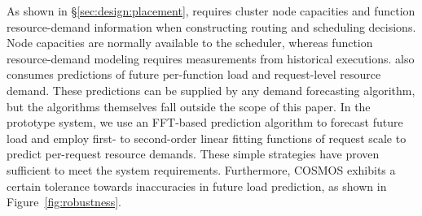 As shown in \S\ref{sec:design:placement}, \sysname requires cluster node
capacities and function resource-demand information when constructing routing
and scheduling decisions. Node capacities are normally available to the
scheduler, whereas function resource-demand modeling requires measurements from historical executions. \sysname also consumes predictions of
future per-function load and request-level resource demand. These predictions can be supplied by any demand forecasting algorithm, but the algorithms themselves fall outside the scope of this paper. In the prototype system, we use an FFT-based prediction algorithm to forecast future load and employ first- to second-order linear fitting functions of request scale to predict per-request resource demands. These simple strategies have proven sufficient to meet the system requirements. Furthermore, COSMOS exhibits a certain tolerance towards inaccuracies in future load prediction, as shown in Figure~\ref{fig:robustness}.
